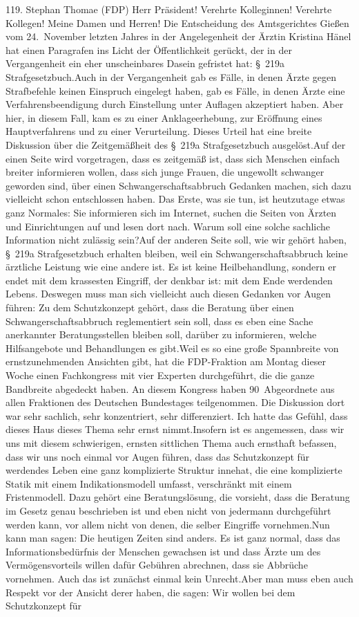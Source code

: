 \documentclass{article}
\begin{document}
	119. Stephan Thomae (FDP) Herr Präsident! Verehrte Kolleginnen! Verehrte Kollegen! Meine Damen und Herren! Die Entscheidung des Amtsgerichtes Gießen vom 24. November letzten Jahres in der Angelegenheit der Ärztin Kristina Hänel hat einen Paragrafen ins Licht der Öffentlichkeit gerückt, der in der Vergangenheit ein eher unscheinbares Dasein gefristet hat: § 219a Strafgesetzbuch.Auch in der Vergangenheit gab es Fälle, in denen Ärzte gegen Strafbefehle keinen Einspruch eingelegt haben, gab es Fälle, in denen Ärzte eine Verfahrensbeendigung durch Einstellung unter Auflagen akzeptiert haben. Aber hier, in diesem Fall, kam es zu einer Anklageerhebung, zur Eröffnung eines Hauptverfahrens und zu einer Verurteilung. Dieses Urteil hat eine breite Diskussion über die Zeitgemäßheit des § 219a Strafgesetzbuch ausgelöst.Auf der einen Seite wird vorgetragen, dass es zeitgemäß ist, dass sich Menschen einfach breiter informieren wollen, dass sich junge Frauen, die ungewollt schwanger geworden sind, über einen Schwangerschaftsabbruch Gedanken machen, sich dazu vielleicht schon entschlossen haben. Das Erste, was sie tun, ist heutzutage etwas ganz Normales: Sie informieren sich im Internet, suchen die Seiten von Ärzten und Einrichtungen auf und lesen dort nach. Warum soll eine solche sachliche Information nicht zulässig sein?Auf der anderen Seite soll, wie wir gehört haben, § 219a Strafgesetzbuch erhalten bleiben, weil ein Schwangerschaftsabbruch keine ärztliche Leistung wie eine andere ist. Es ist keine Heilbehandlung, sondern er endet mit dem krassesten Eingriff, der denkbar ist: mit dem Ende werdenden Lebens. Deswegen muss man sich vielleicht auch diesen Gedanken vor Augen führen: Zu dem Schutzkonzept gehört, dass die Beratung über einen Schwangerschaftsabbruch reglementiert sein soll, dass es eben eine Sache anerkannter Beratungsstellen bleiben soll, darüber zu informieren, welche Hilfsangebote und Behandlungen es gibt.Weil es so eine große Spannbreite von ernstzunehmenden Ansichten gibt, hat die FDP-Fraktion am Montag dieser Woche einen Fachkongress mit vier Experten durchgeführt, die die ganze Bandbreite abgedeckt haben. An diesem Kongress haben 90 Abgeordnete aus allen Fraktionen des Deutschen Bundestages teilgenommen. Die Diskussion dort war sehr sachlich, sehr konzentriert, sehr differenziert. Ich hatte das Gefühl, dass dieses Haus dieses Thema sehr ernst nimmt.Insofern ist es angemessen, dass wir uns mit diesem schwierigen, ernsten sittlichen Thema auch ernsthaft befassen, dass wir uns noch einmal vor Augen führen, dass das Schutzkonzept für werdendes Leben eine ganz komplizierte Struktur innehat, die eine komplizierte Statik mit einem Indikationsmodell umfasst, verschränkt mit einem Fristenmodell. Dazu gehört eine Beratungslösung, die vorsieht, dass die Beratung im Gesetz genau beschrieben ist und eben nicht von jedermann durchgeführt werden kann, vor allem nicht von denen, die selber Eingriffe vornehmen.Nun kann man sagen: Die heutigen Zeiten sind anders. Es ist ganz normal, dass das Informationsbedürfnis der Menschen gewachsen ist und dass Ärzte um des Vermögensvorteils willen dafür Gebühren abrechnen, dass sie Abbrüche vornehmen. Auch das ist zunächst einmal kein Unrecht.Aber man muss eben auch Respekt vor der Ansicht derer haben, die sagen: Wir wollen bei dem Schutzkonzept für 
\end{document}

